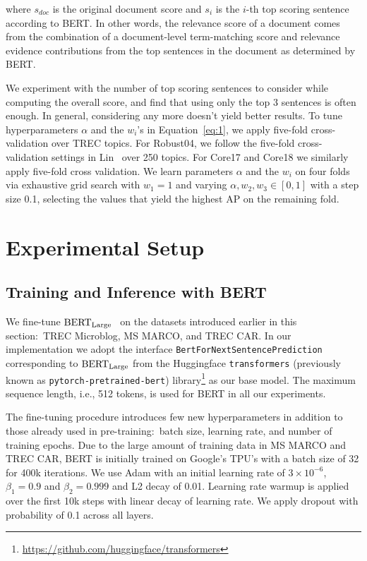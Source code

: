 \noindent where $ s_{doc} $ is the original document score and $ s_i $ is the $ i $-th top scoring sentence according to BERT.
In other words, the relevance score of a document comes from the combination of a document-level term-matching score and relevance evidence contributions from the top sentences in the document as determined by BERT.

We experiment with the number of top scoring sentences to consider while computing the overall score, and find that using only the top 3 sentences is often enough.
In general, considering any more doesn't yield better results.
To tune hyperparameters $ \alpha $ and the $ w_i $'s  in Equation~\ref{eq:1}, we apply five-fold cross-validation over TREC topics.
For Robust04, we follow the five-fold cross-validation settings in Lin~\cite{lin2019neural} over 250 topics.
For Core17 and Core18 we similarly apply five-fold cross validation.
We learn parameters $\alpha$ and the $w_i$ on four folds via exhaustive grid search with $ w_1 = 1 $ and varying $ \alpha, w_2, w_3 \in [0, 1] $ with a step size 0.1, selecting the values that yield the highest AP on the remaining fold.

\section{Experimental Setup}

\subsection{Training and Inference with BERT}

We fine-tune $ \textrm{BERT}_{\textrm{\scriptsize Large}} $~\cite{devlin2018bert} on the datasets introduced earlier in this section:\ TREC Microblog, MS MARCO, and TREC CAR.
In our implementation we adopt the interface \texttt{BertForNextSentencePrediction} corresponding to $ \textrm{BERT}_{\textrm{\scriptsize Large}} $ from the Huggingface \texttt{transformers} (previously known as \texttt{pytorch-pretrained-bert}) library\footnote{\url{https://github.com/huggingface/transformers}} as our base model.
The maximum sequence length, i.e., 512 tokens, is used for BERT in all our experiments.

The fine-tuning procedure introduces few new hyperparameters in addition to those already used in pre-training:\ batch size, learning rate, and number of training epochs.
Due to the large amount of training data in MS MARCO and TREC CAR, BERT is initially trained on Google's TPU's with a batch size of 32 for 400k iterations.
We use Adam \cite{kingma2014adam} with an initial learning rate of $ 3 \times 10^{-6}$, $ \beta_1 = 0.9 $ and $ \beta_2 = 0.999 $ and L2 decay of 0.01.
Learning rate warmup is applied over the first 10k steps with linear decay of learning rate.
We apply dropout with probability of 0.1 across all layers.

